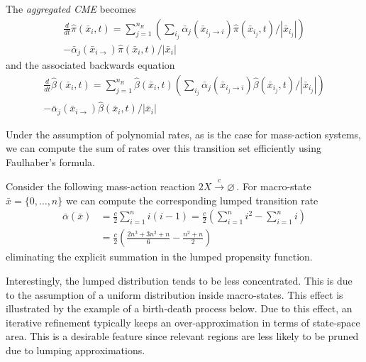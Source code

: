 The \emph{aggregated \ac{CME}} becomes
\begin{multline}\label{eq:lumped_cme}
    \frac{d}{dt}\hat{\pi}(\bar{x}_i, t) =
    \sum_{j=1}^{n_R}
        \left(\sum_{i_j}\bar{\alpha}_j(\bar{x}_{i_j \rightarrow i})\hat{\pi}(\bar{x}_{i_j}, t) / \left| \bar{x}_{i_j}\right|\right)\\
        - \bar{\alpha}_j(\bar{x}_{i\rightarrow})\hat{\pi}(\bar{x}_i, t) / \left| \bar{x}_i \right|
\end{multline}
and the associated backwards equation
\begin{multline}\label{eq:lumped_bcme}
    \frac{d}{dt}\hat{\beta}(\bar{x}_i, t) =
    \sum_{j=1}^{n_R}
        \hat{\beta}(\bar{x}_i, t)
        \left(\sum_{i_j}\bar{\alpha}_j(\bar{x}_{i_j \rightarrow i})\hat{\beta}(\bar{x}_{i_j}, t) / \left| \bar{x}_{i_j}\right|\right)\\
        - \bar{\alpha}_j(\bar{x}_{i\rightarrow})\hat{\beta}(\bar{x}_i, t) / \left| \bar{x}_i \right|
\end{multline}

Under the assumption of polynomial rates, as is the case for mass-action
systems, we can compute the sum of rates over this transition set
efficiently using Faulhaber's formula.
\begin{example}
Consider the following mass-action reaction
$ 2 X \xrightarrow{c} \varnothing\,. $
For macro-state
$\bar{x} = \{0, \dots, n\}$
we can compute the corresponding lumped transition rate
\begin{align*}
	\bar{\alpha}(\bar{x})
	& =\frac{c}{2}\sum_{i=1}^n i (i - 1) 
	=\frac{c}{2}\left(\sum_{i=1}^n i^2 - \sum_{i=1}^ni\right)\\
	& =\frac{c}{2}\left(\frac{2n^3+3n^2+n}{6} - \frac{n^2 + n}{2}\right)
\end{align*}
eliminating the explicit summation in the lumped propensity function.
\end{example}

Interestingly, the lumped distribution
tends to be less concentrated. %
This is due to the assumption of a
uniform distribution inside macro-states.
This effect is illustrated by the example of a birth-death process below.
Due to this effect, an iterative refinement typically keeps an over-approximation in terms of state-space area.
This is a desirable feature since relevant regions are less likely to be pruned due to lumping approximations.

